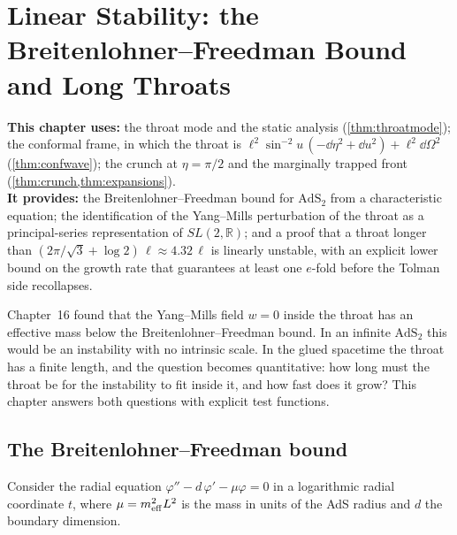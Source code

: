 \chapter{Linear Stability: the Breitenlohner--Freedman Bound and Long Throats}
\label{ch:stability}

\begin{usesbox}
\textbf{This chapter uses:} the throat mode and the static analysis (\cref{thm:throatmode}); the conformal frame, in which the throat is $\ell^2\sin^{-2}u\,(-\dd\eta^2+\dd u^2)+\ell^2\dd\Omega^2$ (\cref{thm:confwave}); the crunch at $\eta=\pi/2$ and the marginally trapped front (\cref{thm:crunch,thm:expansions}).\\
\textbf{It provides:} the Breitenlohner--Freedman bound for $\mathrm{AdS}_2$ from a characteristic equation; the identification of the Yang--Mills perturbation of the throat as a principal-series representation of $SL(2,\mathbb R)$; and a proof that a throat longer than $(2\pi/\sqrt3+\log2)\,\ell\approx4.32\,\ell$ is linearly unstable, with an explicit lower bound on the growth rate that guarantees at least one $e$-fold before the Tolman side recollapses.
\end{usesbox}

Chapter~16 found that the Yang--Mills field $w=0$ inside the throat has an effective mass below the Breitenlohner--Freedman bound. In an infinite $\mathrm{AdS}_2$ this would be an instability with no intrinsic scale. In the glued spacetime the throat has a finite length, and the question becomes quantitative: how long must the throat be for the instability to fit inside it, and how fast does it grow? This chapter answers both questions with explicit test functions.

\section{The Breitenlohner--Freedman bound}

Consider the radial equation $\varphi''-d\,\varphi'-\mu\varphi=0$ in a logarithmic radial coordinate $t$, where $\mu=m_{\rm eff}^2L^2$ is the mass in units of the AdS radius and $d$ the boundary dimension.


